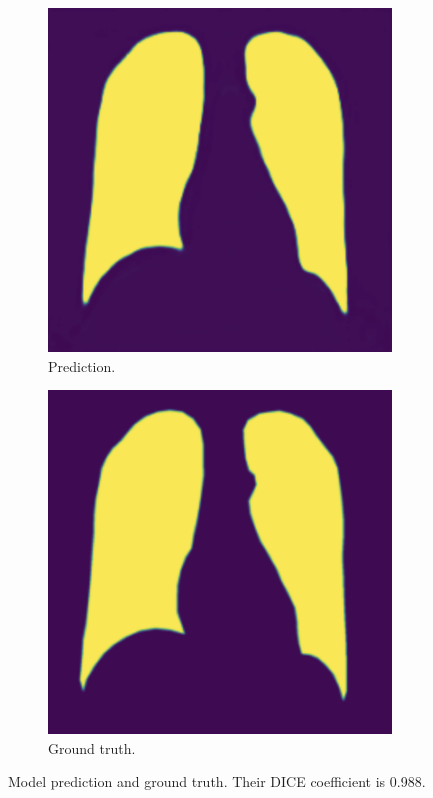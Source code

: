 \begin{figure}
	\centering
	\begin{subfigure}{0.35\linewidth}
		\centering
		\includegraphics[width=\linewidth]{Materials/unetPred}
		\caption{Prediction.}
	\end{subfigure}
	\hspace{1cm}
	\begin{subfigure}{0.35\linewidth}
		\centering
		\includegraphics[width=\linewidth]{Materials/unetTrue}
		\caption{Ground truth.}
	\end{subfigure}	
	\caption{Model prediction and ground truth. Their DICE coefficient is 0.988.}
	\label{unetPred}
\end{figure}
